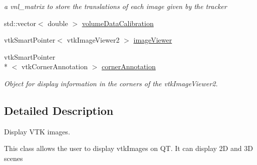 \begin{DoxyCompactItemize}
\begin{DoxyCompactList}\small\item\em a vnl\-\_\-matrix to store the translations of each image given by the tracker \end{DoxyCompactList}\item 
std\-::vector$<$ double $>$ \hyperlink{class_q_v_t_k_image_widget_ad5069809b7e74c437884499f2aaaf0a0}{volume\-Data\-Calibration}
\item 
vtk\-Smart\-Pointer$<$ vtk\-Image\-Viewer2 $>$ \hyperlink{class_q_v_t_k_image_widget_aea73088ee5e4070c846427b8756cbfff}{image\-Viewer}
\item 
vtk\-Smart\-Pointer\\*
$<$ vtk\-Corner\-Annotation $>$ \hyperlink{class_q_v_t_k_image_widget_a4c5a9fab33dfc90a74abe775fb6c50f5}{corner\-Annotation}
\begin{DoxyCompactList}\small\item\em Object for display information in the corners of the vtk\-Image\-Viewer2. \end{DoxyCompactList}\end{DoxyCompactItemize}


\subsection{Detailed Description}
Display V\-T\-K images. 

This class allows the user to display vtk\-Images on Q\-T. It can display 2\-D and 3\-D scenes 

